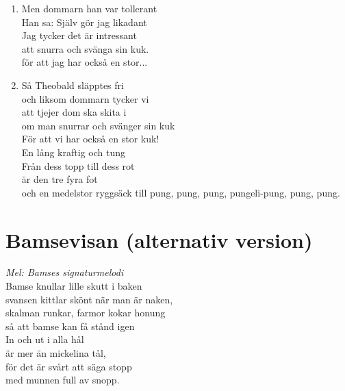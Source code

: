 \documentclass[twoside, openright]{report}
\begin{document}
\begin{enumerate}
\item Men dommarn han var tollerant\\
Han sa: Själv gör jag likadant\\
Jag tycker det är intressant\\
att snurra och svänga sin kuk.\\
för att jag har också en stor...

\item Så Theobald släpptes fri\\
och liksom dommarn tycker vi\\
att tjejer dom ska skita i\\
om man snurrar och svänger sin kuk\\
För att vi har också en stor kuk!\\
En lång kraftig och tung\\
Från dess topp till dess rot\\
är den tre fyra fot\\
och en medelstor ryggsäck till pung, pung, pung, pungeli-pung, pung, pung.

\end{enumerate}

\section{Bamsevisan (alternativ version)}
\textit{Mel: Bamses signaturmelodi}\\

Bamse knullar lille skutt i baken\\
svansen kittlar skönt när man är naken,\\
skalman runkar, farmor kokar honung\\
så att bamse kan få stånd igen\\

In och ut i alla hål\\
är mer än mickelina tål,\\
för det är svårt att säga stopp\\
med munnen full av snopp.

\cleardoublepage
{}
\printindex
\end{document}
